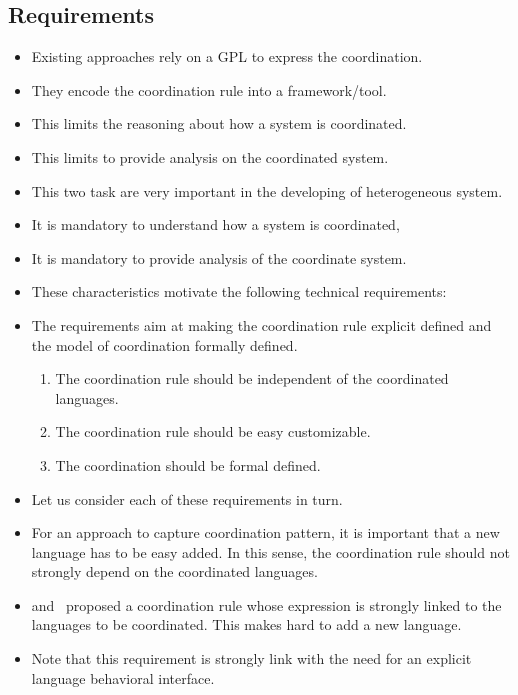 \subsection{Requirements}

\begin{itemize}
	\item Existing approaches rely on a GPL to express the coordination. 
	\item They encode the coordination rule into a framework/tool. 
	\item This limits the reasoning about how a system is coordinated.
	\item This limits to provide analysis on the coordinated system. 
	\item This two task are very important in the developing of heterogeneous system. 
	\item It is mandatory to understand how a system is coordinated, 
	\item It is mandatory to provide analysis of the coordinate system. 
	\item These characteristics motivate the following technical requirements:
	\item The requirements aim at making the coordination rule explicit defined and the model of coordination formally defined. 
	\begin{enumerate}
		\item The coordination rule should be independent of the coordinated languages. 
		\item The coordination rule should be easy customizable. 
		\item The coordination should be formal defined. 
	\end{enumerate}
	
	\item Let us consider each of these requirements in turn. 
	
	\item For an approach to capture coordination pattern, it is important that a new language has to be easy added. In this sense, the coordination rule should not strongly depend on the coordinated languages. 
	\item \cite{dinatale} and~\cite{mascotbib} proposed a coordination rule whose expression is strongly linked to the languages to be coordinated. This makes hard to add a new language. 
	\item Note that this requirement is strongly link with the need for an explicit language behavioral interface.
	

\end{itemize}
